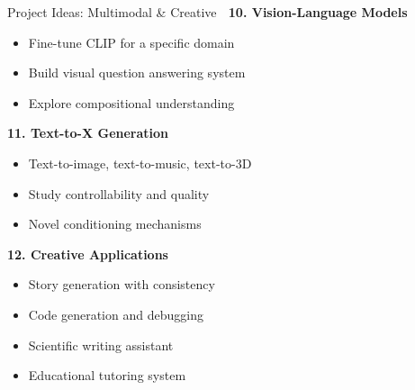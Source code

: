\documentclass[aspectratio=169]{beamer}
\begin{document}
\begin{frame}[shrink=10]{Project Ideas: Multimodal \& Creative 🎨}
\textbf{10. Vision-Language Models}
\begin{itemize}\setlength{\itemsep}{0pt}
    \item Fine-tune CLIP for a specific domain
    \item Build visual question answering system
    \item Explore compositional understanding
\end{itemize}

\vspace{0.5em}

\textbf{11. Text-to-X Generation}
\begin{itemize}\setlength{\itemsep}{0pt}
    \item Text-to-image, text-to-music, text-to-3D
    \item Study controllability and quality
    \item Novel conditioning mechanisms
\end{itemize}

\vspace{0.5em}

\textbf{12. Creative Applications}
\begin{itemize}\setlength{\itemsep}{0pt}
    \item Story generation with consistency
    \item Code generation and debugging
    \item Scientific writing assistant
    \item Educational tutoring system
\end{itemize}
\end{frame}
\end{document}
